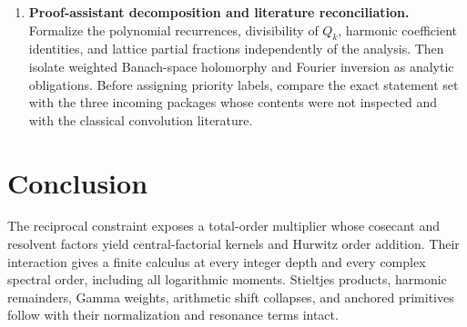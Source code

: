 \begin{enumerate}[label=\textbf{Q\arabic*.},leftmargin=2.8em,itemsep=8pt]
\item \textbf{Proof-assistant decomposition and literature reconciliation.}
Formalize the polynomial recurrences, divisibility of $Q_k$, harmonic
coefficient identities, and lattice partial fractions independently of
the analysis. Then isolate weighted Banach-space holomorphy and Fourier
inversion as analytic obligations. Before assigning priority labels,
compare the exact statement set with the three incoming packages whose
contents were not inspected and with the classical convolution
literature.
\end{enumerate}

\section*{Conclusion}
The reciprocal constraint exposes a total-order multiplier whose
cosecant and resolvent factors yield central-factorial kernels and
Hurwitz order addition. Their interaction gives a finite calculus at
every integer depth and every complex spectral order, including all
logarithmic moments. Stieltjes products, harmonic remainders, Gamma
weights, arithmetic shift collapses, and anchored primitives follow
with their normalization and resonance terms intact.
